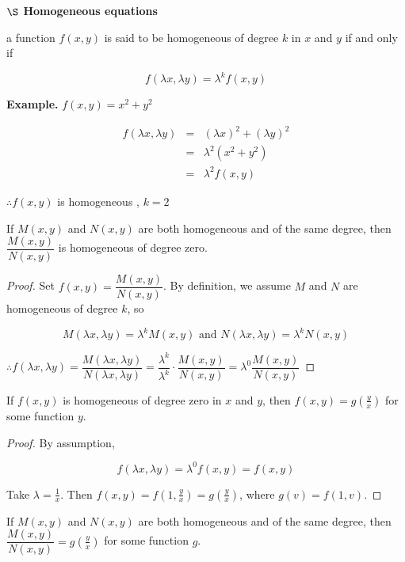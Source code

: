 \textbf{$\S$ Homogeneous equations}

\begin{defn}
	a function $f(x,y)$ is said to be homogeneous of degree $k$ in $x$ and $y$ if and only if
	
	$$f(\lambda x,\lambda y) = \lambda^k f(x,y)$$
\end{defn}

\textbf{Example.} $f(x,y) = x^2 + y^2$

\begin{eqnarray*}
	f(\lambda x , \lambda y) &=& (\lambda x)^2 + (\lambda y)^2\\
	&=& \lambda^2 (x^2 + y^2)\\
	&=& \lambda^2 f(x,y)
\end{eqnarray*}

$\therefore f(x,y)$ is homogeneous  
, $k = 2$

\begin{thm*}
	If $M(x,y)$ and $N(x,y)$ are both homogeneous and of the same degree, then $\dfrac{M(x,y)}{N(x,y)}$ is homogeneous of degree zero.
\end{thm*}
\begin{proof}
	Set $f(x,y) = \dfrac{M(x,y)}{N(x,y)}$. By definition, we assume $M$ and $N$ are homogeneous of degree $k$, so
	
	$$M(\lambda x , \lambda y) = \lambda^k M(x,y) \text{ and } N(\lambda x,\lambda y) = \lambda^kN(x,y)$$
	
	$\therefore f(\lambda x,\lambda y) = \dfrac{M(\lambda x ,\lambda y )}{N(\lambda x, \lambda y)} = \dfrac{\lambda^k}{\lambda^k} \cdot \dfrac{M(x,y)}{N(x,y)} = \lambda^0 \dfrac{M(x,y)}{N(x,y)}$
\end{proof}

\begin{thm*}
	If $f(x,y)$ is homogeneous of degree zero in $x$ and $y$, then $f(x,y) = g(\frac{y}{x})$ for some function $y$.
\end{thm*}

\begin{proof}
	By assumption,
	
	$$f(\lambda x, \lambda y) = \lambda^0f(x,y) = f(x,y)$$
	
	Take $\lambda = \frac{1}{x}$. Then $f(x,y) = f(1,\frac{y}{x}) = g(\frac{y}{x})$, where $g(v) = f(1,v).$
\end{proof}

\begin{cor*}
	If $M(x,y)$ and $N(x,y)$ are both homogeneous and of the same degree, then $\dfrac{M(x,y)}{N(x,y)} = g(\frac{y}{x})$ for some function $g$.
\end{cor*}

